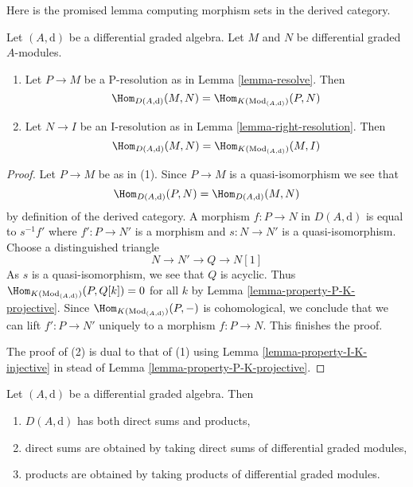 \noindent
Here is the promised lemma computing morphism sets in the
derived category.

\begin{lemma}
\label{lemma-hom-derived}
Let $(A, \text{d})$ be a differential graded algebra.
Let $M$ and $N$ be differential graded $A$-modules.
\begin{enumerate}
\item Let $P \to M$ be a P-resolution as in
Lemma \ref{lemma-resolve}. Then
$$
\Hom_{D(A, \text{d})}(M, N) =
\Hom_{K(\text{Mod}_{(A, \text{d})})}(P, N)
$$
\item Let $N \to I$ be an I-resolution as in
Lemma \ref{lemma-right-resolution}. Then
$$
\Hom_{D(A, \text{d})}(M, N) =
\Hom_{K(\text{Mod}_{(A, \text{d})})}(M, I)
$$
\end{enumerate}
\end{lemma}

\begin{proof}
Let $P \to M$ be as in (1). Since $P \to M$ is a quasi-isomorphism we see that
$$
\Hom_{D(A, \text{d})}(P, N) = \Hom_{D(A, \text{d})}(M, N)
$$
by definition of the derived category. A morphism
$f : P \to N$ in $D(A, \text{d})$ is equal to
$s^{-1}f'$ where $f' : P \to N'$ is a morphism and
$s : N \to N'$ is a quasi-isomorphism. Choose a distinguished triangle
$$
N \to N' \to Q \to N[1]
$$
As $s$ is a quasi-isomorphism, we see that $Q$ is acyclic. Thus
$\Hom_{K(\text{Mod}_{(A, \text{d})})}(P, Q[k]) = 0$ for all $k$ by
Lemma \ref{lemma-property-P-K-projective}. Since
$\Hom_{K(\text{Mod}_{(A, \text{d})})}(P, -)$
is cohomological, we conclude that we can lift $f' : P \to N'$
uniquely to a morphism $f : P \to N$. This finishes the proof.

\medskip\noindent
The proof of (2) is dual to that of (1) using
Lemma \ref{lemma-property-I-K-injective} in stead of
Lemma \ref{lemma-property-P-K-projective}.
\end{proof}

\begin{lemma}
\label{lemma-derived-products}
Let $(A, \text{d})$ be a differential graded algebra. Then
\begin{enumerate}
\item $D(A, \text{d})$ has both direct sums and products,
\item direct sums are obtained by taking direct sums of differential graded
modules,
\item products are obtained by taking products of differential
graded modules.
\end{enumerate}
\end{lemma}

